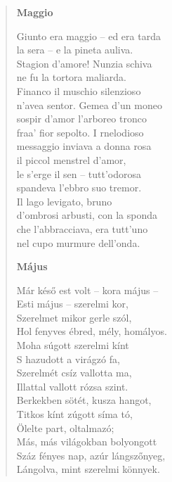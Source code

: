 \begin{verse}
\textbf{Maggio}

\smallskip

Giunto era maggio -- ed era tarda \\
la sera -- e la pineta auliva. \\
Stagion d'amore! Nunzia schiva \\
ne fu la tortora maliarda. \\
Financo il muschio silenzioso \\
n'avea sentor. Gemea d'un moneo \\
sospir d'amor l'arboreo tronco \\
fraa' fior sepolto. I rnelodioso \\
messaggio inviava a donna rosa \\
il piccol menstrel d'amor, \\
le s'erge il sen -- tutt'odorosa \\
spandeva l'ebbro suo tremor. \\
Il lago levigato, bruno \\
d'ombrosi arbusti, con la sponda \\
che l'abbracciava, era tutt'uno \\
nel cupo murmure dell'onda.

\smallskip


\bigskip

\textbf{Május}

\smallskip

Már késő est volt -- kora május -- \\
Esti május -- szerelmi kor, \\
Szerelmet mikor gerle szól, \\
Hol fenyves ébred, mély, homályos. \\
Moha súgott szerelmi kínt \\
S hazudott a virágzó fa, \\
Szerelmét csíz vallotta ma, \\
Illattal vallott rózsa szint. \\
Berkekben sötét, kusza hangot, \\
Titkos kínt zúgott síma tó, \\
Ölelte part, oltalmazó; \\
Más, más világokban bolyongott \\
Száz fényes nap, azúr lángszőnyeg, \\
Lángolva, mint szerelmi könnyek.

\smallskip


\end{verse}
